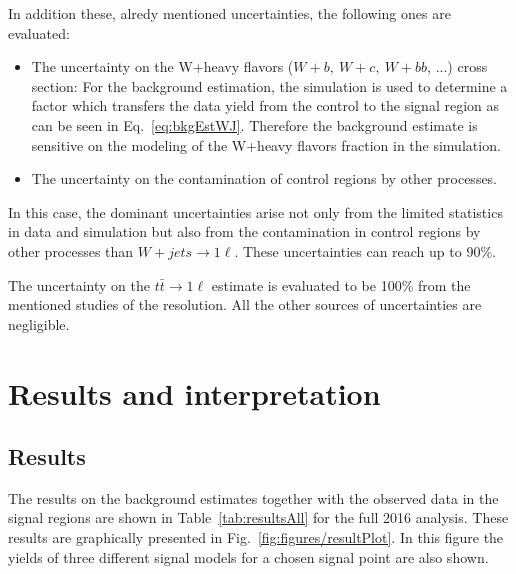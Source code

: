 In addition these, alredy mentioned uncertainties, the following ones are evaluated:
\begin{itemize} 
\item The uncertainty on the W+heavy flavors ($W+b,~W+c,~W+bb$, ...) cross section: For the background estimation, the simulation is used to determine a factor which transfers the data yield from the control to the signal region as can be seen in Eq.~\ref{eq:bkgEstWJ}. Therefore the background estimate is sensitive on the modeling of the W+heavy flavors fraction in the simulation.
\item The uncertainty on the contamination of control regions by other processes.
\end{itemize}

In this case, the dominant uncertainties arise not only from the limited statistics in data and simulation but also from the contamination in  control regions by other  processes than $W+jets \to 1\ell$. These uncertainties can reach up to 90\%.

The uncertainty on the $t\bar{t} \to 1\ell$ estimate is evaluated to be 100\% from the mentioned studies of the \MET resolution. All the other sources of uncertainties are negligible.



\section{Results and interpretation~\label{sec:results}}

\subsection{Results}

The results on the background estimates together with the observed data in the signal regions are shown in Table~\ref{tab:resultsAll} for the full 2016 analysis. These results are graphically presented in Fig.~\ref{fig:figures/resultPlot}. In this figure the yields of three different signal models for a chosen signal point are also shown. 

